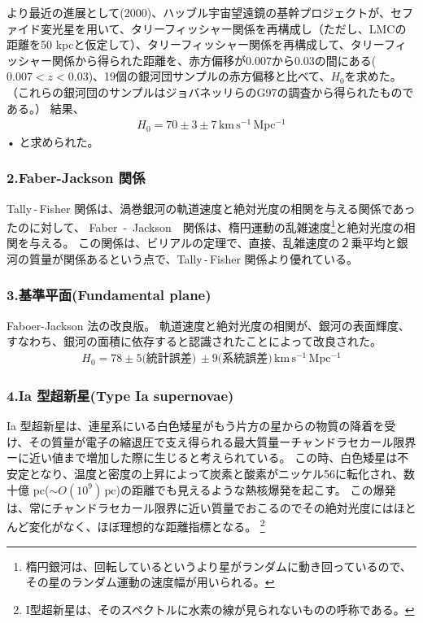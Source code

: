 \documentclass[12pt,a4paper]{article}
\theoremstyle{plain}
\theoremstyle{break}
\begin{document}
より最近の進展として(2000)、ハッブル宇宙望遠鏡の基幹プロジェクトが、セファイド変光星を用いて、タリーフィッシャー関係を再構成し（ただし、LMCの距離を50 kpcと仮定して）、タリーフィッシャー関係を再構成して、タリーフィッシャー関係から得られた距離を、赤方偏移が0.007から0.03の間にある($0.007<z<0.03$)、19個の銀河団サンプルの赤方偏移と比べて、$H_0$を求めた。
（これらの銀河団のサンプルはジョバネッリらのG97の調査から得られたものである。）
結果、
\begin{align}
 H_0 = 70 \pm3 \pm7 \,\mathrm{km\,s^{-1}\,Mpc^{-1}}
\end{align}•%
と求められた。


\subsubsection*{2.Faber-Jackson 関係}
Tally\,-\,Fisher 関係は、渦巻銀河の軌道速度と絶対光度の相関を与える関係であったのに対して、
Faber \,-\, Jackson　関係は、楕円運動の乱雑速度\footnote{楕円銀河は、回転しているというより星がランダムに動き回っているので、 その星のランダム運動の速度幅が用いられる。}と絶対光度の相関を与える。
この関係は、ビリアルの定理で、直接、乱雑速度の２乗平均と銀河の質量が関係あるという点で、Tally\,-\,Fisher 関係より優れている。

\subsubsection*{3.基準平面(Fundamental plane)}
Faboer-Jackson 法の改良版。
軌道速度と絶対光度の相関が、銀河の表面輝度、すなわち、銀河の面積に依存すると認識されたことによって改良された。
\begin{align}
  H_0 = 78 \pm 5 \text{(統計誤差)} \, \pm 9 \text{(系統誤差)} \, \mathrm{km\,s^{-1}\,Mpc^{-1}}
\end{align}

\subsubsection*{4.Ia 型超新星(Type Ia supernovae)}
Ia 型超新星は、連星系にいる白色矮星がもう片方の星からの物質の降着を受け、その質量が電子の縮退圧で支え得られる最大質量ーチャンドラセカール限界ーに近い値まで増加した際に生じると考えられている。
この時、白色矮星は不安定となり、温度と密度の上昇によって炭素と酸素がニッケル56に転化され、数十億 pc($\sim  O(10^9) \, \mathrm{pc} $)の距離でも見えるような熱核爆発を起こす。
この爆発は、常にチャンドラセカール限界に近い質量でおこるのでその絶対光度にはほとんど変化がなく、ほぼ理想的な距離指標となる。
\footnote{
I型超新星は、そのスペクトルに水素の線が見られないものの呼称である。
}
\end{document}
